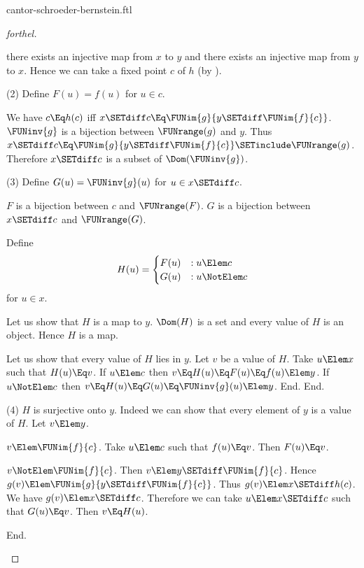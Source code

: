 \documentclass{stex}
\begin{document}
\begin{smodule}{cantor-schroeder-bernstein.ftl}
\begin{proof}[forthel]
\begin{case}{there exists an injective map from $x$ to $y$ and there exists an injective map from $y$ to $x$.}
    Hence we can take a fixed point $c$ of $h$ (by ).

    (2) Define $F(u) = f(u)$ for $u \in c$.

    We have $c \Eq h(c)$ iff $x \SETdiff c \Eq \FUNim{g}{y \SETdiff \FUNim{f}{c}}$.
    $\FUNinv{g}$ is a bijection between $\FUNrange(g)$ and $y$.
    Thus $x \SETdiff c \Eq \FUNim{g}{y \SETdiff \FUNim{f}{c}} \SETinclude \FUNrange(g)$.
    Therefore $x \SETdiff c$ is a subset of $\Dom(\FUNinv{g})$.

    (3) Define $G(u) = \FUNinv{g}(u)$ for $u \in x \SETdiff c$.

    $F$ is a bijection between $c$ and $\FUNrange(F)$.
    $G$ is a bijection between $x \SETdiff c$ and $\FUNrange(G)$.

    Define \[ H(u) =
      \begin{cases}
        F(u) & : u \Elem c \\
        G(u) & : u \NotElem c
      \end{cases} \]
    for $u \in x$.

    Let us show that $H$ is a map to $y$.
      $\Dom(H)$ is a set and every value of $H$ is an object.
      Hence $H$ is a map.

      Let us show that every value of $H$ lies in $y$.
        Let $v$ be a value of $H$.
        Take $u \Elem x$ such that $H(u) \Eq v$.
        If $u \Elem c$ then $v \Eq H(u) \Eq F(u) \Eq f(u) \Elem y$.
        If $u \NotElem c$ then $v \Eq H(u) \Eq G(u) \Eq \FUNinv{g}(u) \Elem y$.
      End.
    End.

    (4) $H$ is surjective onto $y$.
    Indeed we can show that every element of $y$ is a value of $H$.
      Let $v \Elem y$.

      \begin{case}{$v \Elem \FUNim{f}{c}$.}
        Take $u \Elem c$ such that $f(u) \Eq v$.
        Then $F(u) \Eq v$.
      \end{case}

      \begin{case}{$v \NotElem \FUNim{f}{c}$.}
        Then $v \Elem y \SETdiff \FUNim{f}{c}$.
        Hence $g(v) \Elem \FUNim{g}{y \SETdiff \FUNim{f}{c}}$.
        Thus $g(v) \Elem\linebreak x \SETdiff h(c)$.
        We have $g(v) \Elem x \SETdiff c$.
        Therefore we can take $u \Elem x \SETdiff c$ such that $G(u) \Eq v$.
        Then $v \Eq H(u)$.
      \end{case}
    End.


\end{case}
\end{proof}
\end{smodule}
\end{document}

